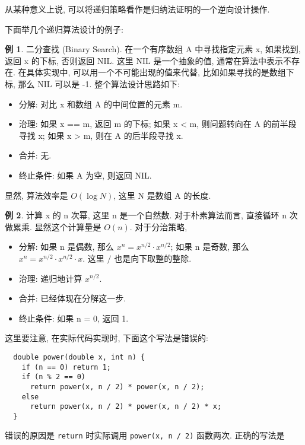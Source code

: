 \documentclass[a4paper]{ctexart}
\theoremstyle{definition}
\theoremstyle{definition}
\newtheorem{example}{例}[section]
\begin{document}
从某种意义上说, 可以将递归策略看作是归纳法证明的一个逆向设计操作.

下面举几个递归算法设计的例子: 

\begin{example}
  二分查找 (Binary Search). 在一个有序数组 A 中寻找指定元素 x, 如果找到, 返回 x 的下标, 否则返回 NIL. 这里 NIL 是一个抽象的值, 
  通常在算法中表示不存在. 在具体实现中, 可以用一个不可能出现的值来代替, 比如如果寻找的是数组下标, 那么 NIL 可以是 -1. 整个算法设计思路如下: 
  \begin{itemize}
    \item 分解: 对比 x 和数组 A 的中间位置的元素 m.
    \item 治理: 如果 x == m, 返回 m 的下标; 如果 x < m, 则问题转向在 A 的前半段寻找 x; 如果 x > m, 则在 A 的后半段寻找 x.
    \item 合并: 无.
    \item 终止条件: 如果 A 为空, 则返回 NIL. 
  \end{itemize}
\end{example}

显然, 算法效率是 $O(\log N)$, 这里 N 是数组 A 的长度.

\begin{example}
  计算 x 的 n 次幂, 这里 n 是一个自然数. 对于朴素算法而言, 直接循环 n 次做累乘. 显然这个计算量是 $O(n)$. 对于分治策略, 
  \begin{itemize}
    \item 分解: 如果 n 是偶数, 那么 $x^n = x^{n / 2} \cdot x^{n / 2}$; 如果 n 是奇数, 那么 $x^n = x^{n / 2} \cdot x^{n / 2} \cdot x$. 这里 $/$ 也是向下取整的整除. 
    \item 治理: 递归地计算 $x^{n / 2}$.
    \item 合并: 已经体现在分解这一步. 
    \item 终止条件: 如果 n = 0, 返回 1.
  \end{itemize}
\end{example}

这里要注意, 在实际代码实现时, 下面这个写法是错误的:

\begin{verbatim}
  double power(double x, int n) { 
    if (n == 0) return 1;
    if (n % 2 == 0)
      return power(x, n / 2) * power(x, n / 2);
    else 
      return power(x, n / 2) * power(x, n / 2) * x; 
  }
\end{verbatim}

错误的原因是 \verb|return| 时实际调用 \verb|power(x, n / 2)| 函数两次.
正确的写法是 
\end{document}
